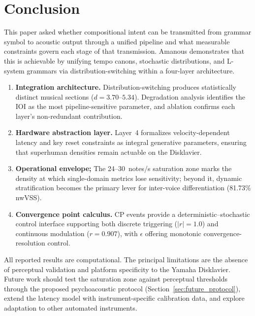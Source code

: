 \documentclass[a4paper]{article}
\theoremstyle{definition}
\theoremstyle{remark}
\begin{document}
\section{Conclusion}
\label{sec:conclusion}

This paper asked whether compositional intent can be transmitted from grammar symbol to acoustic output through a unified pipeline and what measurable constraints govern each stage of that transmission. Amanous demonstrates that this is achievable by unifying tempo canons, stochastic distributions, and L-system grammars via distribution-switching within a four-layer architecture.

\begin{enumerate}
    \item \textbf{Integration architecture.} Distribution-switching produces statistically distinct musical sections ($d = 3.70$--$5.34$). Degradation analysis identifies the IOI as the most pipeline-sensitive parameter, and ablation confirms each layer's non-redundant contribution.

    \item \textbf{Hardware abstraction layer.} Layer~4 formalizes velocity-dependent latency and key reset constraints as integral generative parameters, ensuring that superhuman densities remain actuable on the Disklavier.

    \item \textbf{Operational envelope;} The 24--30~notes/s saturation zone marks the density at which single-domain metrics lose sensitivity; beyond it, dynamic stratification becomes the primary lever for inter-voice differentiation (81.73\% nwVSS).

    \item \textbf{Convergence point calculus.} CP events provide a deterministic--stochastic control interface supporting both discrete triggering ($|r| = 1.0$) and continuous modulation ($r = 0.907$), with $\epsilon$ offering monotonic convergence-resolution control.
\end{enumerate}

All reported results are computational. The principal limitations are the absence of perceptual validation and platform specificity to the Yamaha Disklavier. Future work should test the saturation zone against perceptual thresholds through the proposed psychoacoustic protocol (Section~\ref{sec:future_protocol}), extend the latency model with instrument-specific calibration data, and explore adaptation to other automated instruments.
\end{document}
